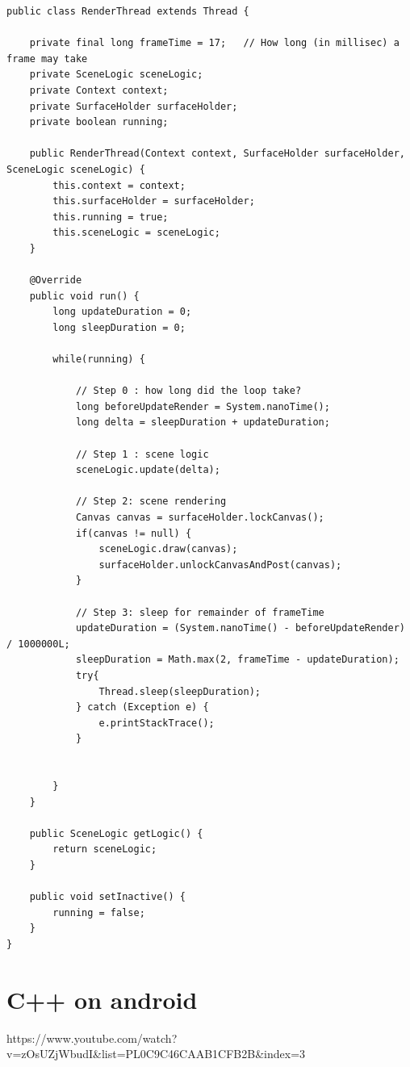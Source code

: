 \begin{lstlisting}
public class RenderThread extends Thread {

    private final long frameTime = 17;   // How long (in millisec) a frame may take
    private SceneLogic sceneLogic;
    private Context context;
    private SurfaceHolder surfaceHolder;
    private boolean running;

    public RenderThread(Context context, SurfaceHolder surfaceHolder, SceneLogic sceneLogic) {
        this.context = context;
        this.surfaceHolder = surfaceHolder;
        this.running = true;
        this.sceneLogic = sceneLogic;
    }

    @Override
    public void run() {
        long updateDuration = 0;
        long sleepDuration = 0;

        while(running) {

            // Step 0 : how long did the loop take?
            long beforeUpdateRender = System.nanoTime();
            long delta = sleepDuration + updateDuration;

            // Step 1 : scene logic
            sceneLogic.update(delta);

            // Step 2: scene rendering
            Canvas canvas = surfaceHolder.lockCanvas();
            if(canvas != null) {
                sceneLogic.draw(canvas);
                surfaceHolder.unlockCanvasAndPost(canvas);
            }

            // Step 3: sleep for remainder of frameTime
            updateDuration = (System.nanoTime() - beforeUpdateRender) / 1000000L;
            sleepDuration = Math.max(2, frameTime - updateDuration);
            try{
                Thread.sleep(sleepDuration);
            } catch (Exception e) {
                e.printStackTrace();
            }


        }
    }

    public SceneLogic getLogic() {
        return sceneLogic;
    }

    public void setInactive() {
        running = false;
    }
}
\end{lstlisting}





\section{C++ on android}
https://www.youtube.com/watch?v=zOsUZjWbudI&list=PL0C9C46CAAB1CFB2B&index=3



